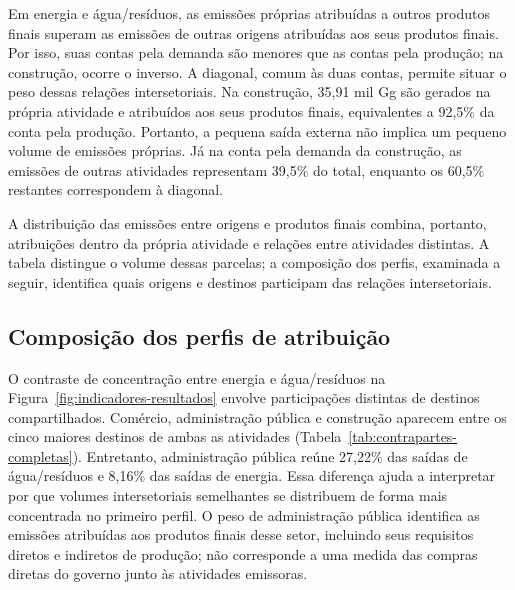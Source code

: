 Em energia e água/resíduos, as emissões próprias atribuídas a outros produtos finais superam as emissões de outras origens atribuídas aos seus produtos finais. Por isso, suas contas pela demanda são menores que as contas pela produção; na construção, ocorre o inverso. A diagonal, comum às duas contas, permite situar o peso dessas relações intersetoriais. Na construção, 35,91 mil Gg são gerados na própria atividade e atribuídos aos seus produtos finais, equivalentes a 92,5\% da conta pela produção. Portanto, a pequena saída externa não implica um pequeno volume de emissões próprias. Já na conta pela demanda da construção, as emissões de outras atividades representam 39,5\% do total, enquanto os 60,5\% restantes correspondem à diagonal.

A distribuição das emissões entre origens e produtos finais combina, portanto, atribuições dentro da própria atividade e relações entre atividades distintas. A tabela distingue o volume dessas parcelas; a composição dos perfis, examinada a seguir, identifica quais origens e destinos participam das relações intersetoriais.





\subsection{Composição dos perfis de atribuição}
\label{sec:composicao-perfis}

O contraste de concentração entre energia e água/resíduos na Figura~\ref{fig:indicadores-resultados} envolve participações distintas de destinos compartilhados. Comércio, administração pública e construção aparecem entre os cinco maiores destinos de ambas as atividades (Tabela~\ref{tab:contrapartes-completas}). Entretanto, administração pública reúne 27,22\% das saídas de água/resíduos e 8,16\% das saídas de energia. Essa diferença ajuda a interpretar por que volumes intersetoriais semelhantes se distribuem de forma mais concentrada no primeiro perfil. O peso de administração pública identifica as emissões atribuídas aos produtos finais desse setor, incluindo seus requisitos diretos e indiretos de produção; não corresponde a uma medida das compras diretas do governo junto às atividades emissoras.

